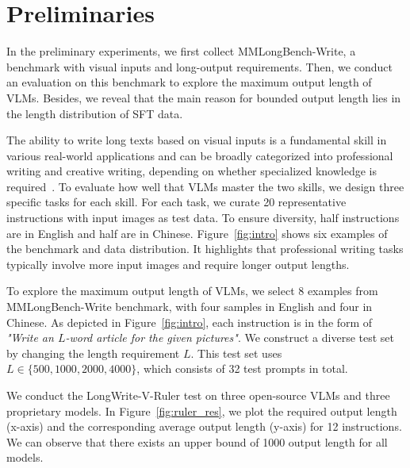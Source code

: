 \section{Preliminaries}
\label{sec:preliminary}
In the preliminary experiments, we first collect MMLongBench-Write, a benchmark with visual inputs and long-output requirements. Then, we conduct an evaluation on this benchmark to explore the maximum output length of VLMs.  Besides, we reveal that the main reason for bounded output length lies in the length distribution of SFT data.

The ability to write long texts based on visual inputs is a fundamental skill in various real-world applications and can be broadly categorized into professional writing and creative writing, depending on whether specialized knowledge is required~\cite{taavitsainen2000conventions}. 
To evaluate how well that VLMs master the two skills, we design three specific tasks for each skill. For each task, we curate 20 representative instructions with input images as test data. To ensure diversity, half instructions are in English and half are in Chinese. Figure~\ref{fig:intro} shows six examples of the benchmark and data distribution. It highlights that professional writing tasks typically involve more input images and require longer output lengths. 


To explore the maximum output length of VLMs, we select 8 examples from MMLongBench-Write benchmark, with four samples in English and four in Chinese. As depicted in Figure~\ref{fig:intro}, each instruction is in the form of \textit{"Write an $L$-word article for the given pictures"}. We construct a diverse test set by changing the length requirement $L$. This test set uses $L \in \{500, 1000, 2000, 4000\}$, which consists of 32 test prompts in total. 


We conduct the LongWrite-V-Ruler test on three open-source VLMs and three proprietary models. In Figure~\ref{fig:ruler_res}, we plot the required output length (x-axis) and the corresponding average output length (y-axis) for 12 instructions. We can observe that there exists an upper bound of 1000 output length for all models.


